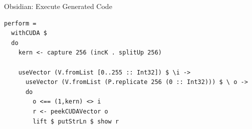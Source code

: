 \documentclass[xcolor=dvipsnames]{beamer}
\begin{document}
\begin{frame}[fragile]{Obsidian: Execute Generated Code}
  
  \begin{block}{}
    \Fontvi
\begin{verbatim}
perform =
  withCUDA $
  do
    kern <- capture 256 (incK . splitUp 256) 

    useVector (V.fromList [0..255 :: Int32]) $ \i ->
      useVector (V.fromList (P.replicate 256 (0 :: Int32))) $ \ o ->
      do
        o <== (1,kern) <> i 
        r <- peekCUDAVector o
        lift $ putStrLn $ show r     
\end{verbatim} 
  \end{block}
\end{frame} 
%
\end{document}
